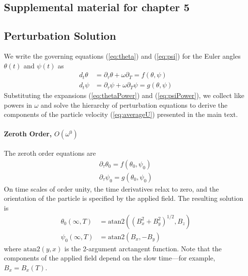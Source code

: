 \begin{appendices}



\chapter{Supplemental material for chapter 5}


\section{ Perturbation Solution}

We write the governing equations (\ref{eq:theta}) and (\ref{eq:psi}) for the Euler angles $\theta(t)$ and $\psi(t)$ as 
\begin{align}
    d_t\theta &= \partial_{\tau}  \theta + \omega \partial_T = f(\theta,\psi)
    \\
    d_t\psi &= \partial_{\tau} \psi +\omega \partial_T \psi = g(\theta,\psi)
\end{align}
Substituting the expansions (\ref{eq:thetaPower}) and (\ref{eq:psiPower}), we collect like powers in $\omega$ and solve the hierarchy of perturbation equations to derive the components of the particle velocity (\ref{eq:averageU}) presented in the main text.

\subsubsection{Zeroth Order, $O(\omega^0)$}

The zeroth order equations are 
\begin{align}
    \partial_{\tau} \theta_0 = f(\theta_0,\psi_0)
    \\
    \partial_{\tau} \psi_0 = g(\theta_0,\psi_0)
\end{align}
On time scales of order unity, the time derivatives relax to zero, and the orientation of the particle is specified by the applied field. The resulting solution is 
\begin{align}
    \theta_0(\infty,T) &= \mathrm{atan2}((B_x^2+B_y^2)^{1/2},B_z) \label{eq:theta0}
    \\
    \psi_0(\infty,T) &= \mathrm{atan2}(B_x,-B_y) \label{eq:psi0}
\end{align}
where $\mathrm{atan2}(y,x)$ is the 2-argument arctangent function. Note that the components of the applied field depend on the slow time---for example, $B_x = B_x(T)$.


\end{appendices}
